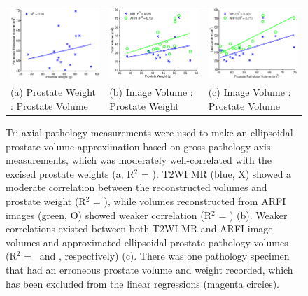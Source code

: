 \begin{figure}[htb!]
\centering
\begin{small}
\begin{tabular}{lll}
\includegraphics[width=0.3\linewidth]{figs/corr_path_vol_weight_vol} &
\includegraphics[width=0.3\linewidth]{figs/corr_weight_vol} &
\includegraphics[width=0.3\linewidth]{figs/corr_pathVol_vol} \\
(a) Prostate Weight : Prostate Volume & (b) Image Volume : Prostate Weight & (c) Image Volume : Prostate Volume \\
\end{tabular}
\end{small}
\caption{Tri-axial pathology measurements were used to make an ellipsoidal
    prostate volume approximation based on gross pathology axis measurements,
    which was moderately well-correlated with the excised prostate weights (a,
    R$^2$ = \pathVolWeightRsq).  T2WI MR (blue, X) showed a moderate
    correlation between the reconstructed volumes and prostate weight (R$^2$ =
    \weightMRrsq), while volumes reconstructed from ARFI images (green, O)
    showed weaker correlation (R$^2$ = \weightARFIrsq) (b).  Weaker
    correlations existed between both T2WI MR and ARFI image volumes and
    approximated ellipsoidal prostate pathology volumes (R$^2$ =
    \pathVolMRrsq~and \pathVolARFIrsq, respectively) (c).  There was one
    pathology specimen that had an erroneous prostate volume and weight
    recorded, which has been excluded from the linear regressions (magenta
    circles).}
\label{fig:mr_arfi_weight}
\end{figure}
